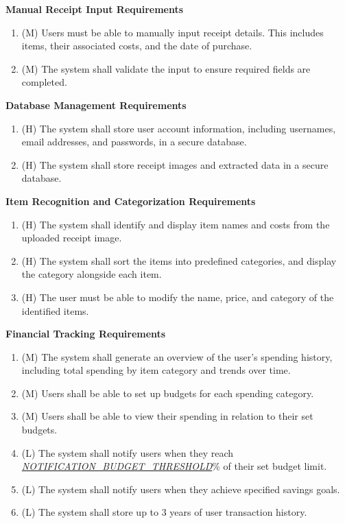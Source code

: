 \documentclass[12pt]{article}
\begin{document}
\textbf{Manual Receipt Input Requirements}
\begin{enumerate}[label=FR-MIS-\arabic*]
  \item (M) Users must be able to manually input receipt details. This includes
  items, their associated costs, and the date of purchase.
  \item (M) The system shall validate the input to ensure required fields are
  completed.
  \end{enumerate}

\textbf{Database Management Requirements}
\begin{enumerate}[label=FR-DM-\arabic*]
  \item (H) The system shall store user account information, including usernames,
  email addresses, and passwords, in a secure database.
  \item (H) The system shall store receipt images and extracted data in a secure database.
\end{enumerate}

\textbf{Item Recognition and Categorization Requirements}
\begin{enumerate}[label=FR-RS-\arabic*]
  \item (H) The system shall identify and display item names and costs from the
  uploaded receipt image.
  \item (H) The system shall sort the items into predefined categories, and
  display the category alongside each item.
  \item (H) The user must be able to modify the name, price, and category of the
  identified items.   
\end{enumerate}

\textbf{Financial Tracking Requirements}
\begin{enumerate}[label=FR-FT-\arabic*]
  \item (M) The system shall generate an overview of the user's spending history,
  including total spending by item category and trends over time.
  \item (M) Users shall be able to set up budgets for each spending category.
  \item (M) Users shall be able to view their spending in relation to their set
  budgets.
  \item (L) The system shall notify users when they reach
  \hyperref[Table:AuxConstants]{\textit{NOTIFICATION\_BUDGET\_THRESHOLD}}\%
  of their set budget limit.
  \item (L) The system shall notify users when they achieve specified savings goals.
  \item (L) The system shall store up to 3 years of user transaction history.
\end{enumerate}
\end{document}
